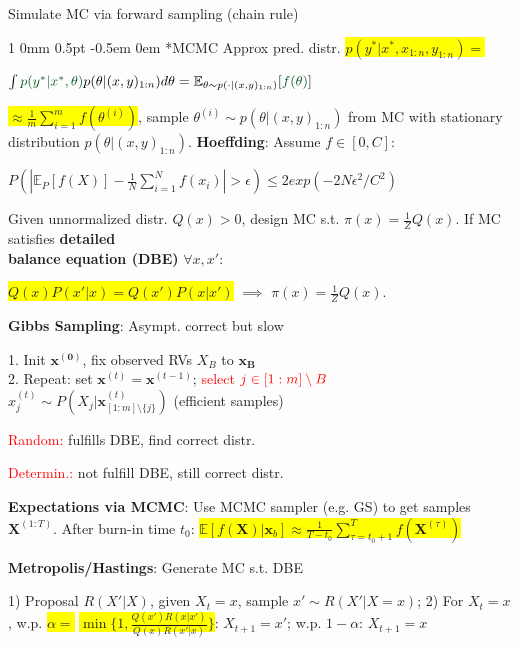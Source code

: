 \documentclass[11pt,landscape,a4paper,fleqn]{article}
\makeatletter
\newcommand*{\rsection}{%
	\@startsection{section}%
	{1}%
	{0mm}%
	{0.5pt}%
	{-0.5em \@plus 0em}
	{\color{myorange}\sffamily\small\bfseries}}
\newcommand{\mhl}[1]{\setlength{\fboxsep}{0pt}\colorbox{yellow}{#1}}
\makeatother
\begin{document}
\begin{multicols*}{4}
Simulate MC via forward sampling (chain rule)

\rsection*{MCMC} Approx pred. distr. \mhl{$p(y^* | x^*, x_{1:n}, y_{1:n}) =$}

$\int \textcolor{darkgreen}{p(y^* | x^*, \theta)} p(\theta | (x,y)_{1:n})d\theta = \mathbb{E}_{\theta \sim p(\cdot | (x,y)_{1:n})}[\textcolor{darkgreen}{f(\theta)}]$

\mhl{$\approx \frac{1}{m} \sum_{i=1}^{m} f(\theta^{(i)})$}, sample $\theta^{(i)} \sim p(\theta | (x,y)_{1:n})$ from MC with stationary distribution $p(\theta| (x,y)_{1:n})$.
\textbf{Hoeffding}: Assume $f \in [0,C]$:

\mbox{\fontsize{9.5}{6}\selectfont $P(|\mathbb{E}_P[f(X)] - \frac{1}{N}\sum_{i=1}^{N} f(x_i)| > \epsilon) \leq 2 exp(-2N\epsilon^2/C^2)$}



Given unnormalized distr. $Q(x) > 0$, design MC s.t. $\pi(x) = \frac{1}{Z} Q(x)$. If MC satisfies \textbf{detailed\\ balance equation (DBE)} $\forall x,x'$:

\mhl{$Q(x)P(x' | x) = Q(x')P(x | x')$} $\implies$ $\pi(x) = \frac{1}{Z} Q(x)$.

\textbf{Gibbs Sampling}: Asympt. correct but slow

1. Init $\mathbf{x^{(0)}}$, fix observed RVs $X_B$ to $\mathbf{x_B}$\\
2. Repeat: set $\mathbf{x}^{(t)} = \mathbf{x}^{(t-1)}$; \textcolor{red}{select} $\textcolor{red}{j \in [1:m] \setminus B}$\\
$x_j^{(t)} \sim P(X_j | \mathbf{x}^{(t)}_{[1:m] \setminus \{j\}})$ (efficient samples)

\textcolor{red}{Random:} fulfills DBE, find correct distr.

\textcolor{red}{Determin.:} not fulfill DBE, still correct distr.

\vspace*{1mm}
\textbf{Expectations via MCMC}: Use MCMC sampler (e.g. GS) to get samples $\mathbf{X}^{(1:T)}$. After burn-in time $t_0$:
\mhl{$\mathbb{E}[f(\mathbf{X}) | \mathbf{x}_b] \approx \frac{1}{T - t_0} \sum_{\tau = t_0 + 1}^{T} f(\mathbf{X}^{(\tau)})$}


\textbf{Metropolis/Hastings}: Generate MC s.t. DBE

1) Proposal $R(X' | X)$, given $X_t = x$, sample $x' \sim R(X' | X=x)$; 2) For $X_t = x$, w.p. \mhl{$\alpha =$} \mhl{$\min \{ 1, \frac{Q(x')R(x | x')}{Q(x) R(x' | x)}\}$}: $X_{t+1} = x'$; w.p. $1 - \alpha$: $X_{t+1} = x$


\end{multicols*}
\end{document}
